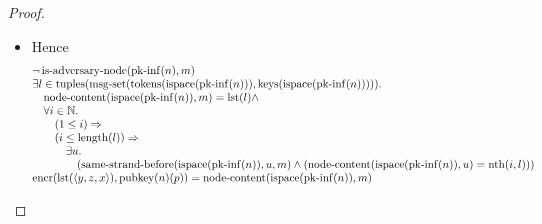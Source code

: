 \documentclass[11pt]{article}
\theoremstyle{plain}
\begin{document}
\begin{proof}
\begin{itemize}[leftmargin=2.8em, itemsep=4pt, parsep=1pt]
\begin{itemize}[leftmargin=2.8em, itemsep=4pt, parsep=1pt]
  \item[\textbf{215--220}] Hence 
\begin{equation*}
\begin{array}{@{}l@{}}
\neg \operatorname{is\text{-}adversary\text{-}node}(\operatorname{pk\text{-}inf}(n), m) \\
\begin{array}{@{}l@{}} \exists l \in \operatorname{tuples}(\operatorname{msg\text{-}set}(\operatorname{tokens}(\operatorname{ispace}(\operatorname{pk\text{-}inf}(n))), \operatorname{keys}(\operatorname{ispace}(\operatorname{pk\text{-}inf}(n))))). \\ \quad \operatorname{node\text{-}content}(\operatorname{ispace}(\operatorname{pk\text{-}inf}(n)), m) = \operatorname{lst}(l) \wedge \\ \quad \forall i \in \mathbb{N}. \\ \quad \quad (1 \leq i) \Rightarrow  \\ \quad \quad (i \leq \operatorname{length}(l)) \Rightarrow  \\ \quad \quad \quad \exists u. \\ \quad \quad \quad \quad (\operatorname{same\text{-}strand\text{-}before}(\operatorname{ispace}(\operatorname{pk\text{-}inf}(n)), u, m) \wedge (\operatorname{node\text{-}content}(\operatorname{ispace}(\operatorname{pk\text{-}inf}(n)), u) = \operatorname{nth}(i, l))) \end{array} \\
\operatorname{encr}(\operatorname{lst}(\langle y, z, x \rangle), \operatorname{pubkey}(n)(p)) = \operatorname{node\text{-}content}(\operatorname{ispace}(\operatorname{pk\text{-}inf}(n)), m) \\

\end{array}
\end{equation*}
\end{itemize}
\end{itemize}
\end{proof}
\end{document}
